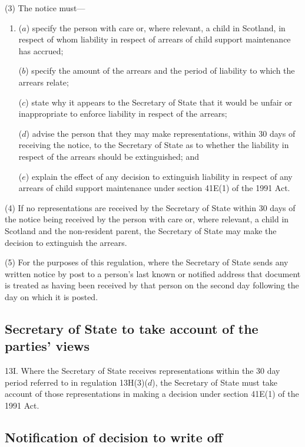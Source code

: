 \documentclass[12pt,a4paper]{article}
\begin{document}
(3) The notice must—
\begin{enumerate}\item[]
($a$) specify the person with care or, where relevant, a child in Scotland, in respect of whom liability in respect of arrears of child support maintenance has accrued;

($b$) specify the amount of the arrears and the period of liability to which the arrears relate;

($c$) state why it appears to the Secretary of State that it would be unfair or inappropriate to enforce liability in respect of the arrears;

($d$) advise the person that they may make representations, within 30 days of receiving the notice, to the Secretary of State as to whether the liability in respect of the arrears should be extinguished; and

($e$) explain the effect of any decision to extinguish liability in respect of any arrears of child support maintenance under section 41E(1) of the 1991 Act.
\end{enumerate}

(4) If no representations are received by the Secretary of State within 30 days of the notice being received by the person with care or, where relevant, a child in Scotland and the non-resident parent, the Secretary of State may make the decision to extinguish the arrears.

(5) For the purposes of this regulation, where the Secretary of State sends any written notice by post to a person’s last known or notified address that document is treated as having been received by that person on the second day following the day on which it is posted.

\subsection[13I. Secretary of State to take account of the parties’ views]{Secretary of State to take account of the parties’ views}

13I.  Where the Secretary of State receives representations within the 30 day period referred to in regulation 13H(3)($d$), the Secretary of State must take account of those representations in making a decision under section 41E(1) of the 1991 Act.

\subsection[13J. Notification of decision to write off]{Notification of decision to write off}
\end{document}

